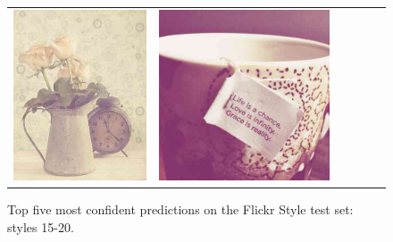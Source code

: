 \begin{figure}
\begin{tabular}{m{.01\linewidth} m{.16\linewidth} m{.16\linewidth} m{.16\linewidth} m{.16\linewidth} m{.16\linewidth}}
    \includegraphics[width=\linewidth]{../style/figures/flickr_on_flickr/pred_style_Vintage/3.jpg} &
    \includegraphics[width=\linewidth]{../style/figures/flickr_on_flickr/pred_style_Vintage/4.jpg}
\end{tabular}
\caption{
    Top five most confident predictions on the Flickr Style test set: styles 15-20.
}\label{fig:flickr_on_flickr3}
\end{figure}

